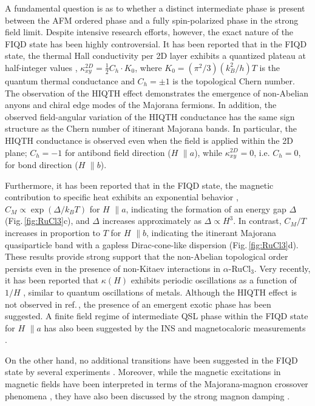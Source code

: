 \documentclass[twocolumn,preprintnumbers,prl,superscriptaddress,amsmath,amssymb,amsfonts]{revtex4}
\begin{document}
A fundamental question is as to whether a distinct intermediate phase is present between the AFM ordered phase and a fully spin-polarized phase in the strong field limit. Despite intensive research efforts, however, the exact nature of the FIQD state has been highly controversial. It has been reported that in the  FIQD state, the thermal Hall conductivity per 2D layer exhibits a quantized plateau at half-integer values \cite{kasahara2018majorana,yokoi2021half,PhysRevB.102.220404,bruin2021robustness}, $\kappa_{xy}^{2D}=\frac{1}{2}C_h\cdot K_0$, where $K_0=(\pi^2/3)(k_B^2/h)T$ is the quantum thermal conductance and $C_h=\pm 1$ is the topological Chern number. The observation of the HIQTH effect demonstrates the emergence of non-Abelian anyons and chiral edge modes of the Majorana fermions. In addition, the observed field-angular variation of the HIQTH conductance \cite{yokoi2021half} has the same sign structure as the Chern number of itinerant Majorana bands. In particular, the HIQTH conductance is observed even when the field is applied within the 2D plane; $C_h=-1$ for antibond field direction ({\boldmath $H$} $\parallel a$), while $\kappa_{xy}^{2D}=0$, i.e. $C_h=0$, for bond direction ({\boldmath $H$}  $\parallel b$).

Furthermore, it has been reported that in the FIQD state, the magnetic contribution to specific heat exhibits an exponential behavior \cite{tanaka2020thermodynamic}, $C_M\propto \exp(\Delta/k_BT)$ for  {\boldmath $H$} $\parallel a$, indicating the formation of an energy gap $\Delta$ (Fig.\,\ref{fig:RuCl3}c), and $\Delta$ increases approximately as $\Delta\propto H^3$. In contrast, $C_M/T$ increases in proportion to $T$ for {\boldmath $H$} $\parallel b$, indicating the itinerant Majorana quasiparticle band with a gapless Dirac-cone-like dispersion (Fig.\,\ref{fig:RuCl3}d). These results provide strong support that the non-Abelian topological order persists even in the presence of non-Kitaev interactions in $\alpha$-RuCl$_3$. Very recently, it has been reported that $\kappa(H)$ exhibits periodic oscillations as a function of $1/H$ \cite{czajka2021oscillations}, similar to quantum oscillations of metals. Although the HIQTH effect is not observed in ref.\,, the presence of an emergent exotic phase has been suggested. A finite field regime of intermediate QSL phase within the FIQD state for {\boldmath $H$} $\parallel a$ has also been suggested by the INS and magnetocaloric measurements \cite{PhysRevB.100.060405}.

On the other hand, no additional transitions have been suggested in the FIQD state by several experiments \cite{PhysRevB.103.054440,modic2021scale,PhysRevLett.125.037202}. Moreover, while the magnetic excitations in magnetic fields have been interpreted in terms of the Majorana-magnon crossover phenomena \cite{PhysRevB.101.100408}, they have also been discussed by the strong magnon damping \cite{winter2017breakdown,PhysRevResearch.2.033011}.
\end{document}
